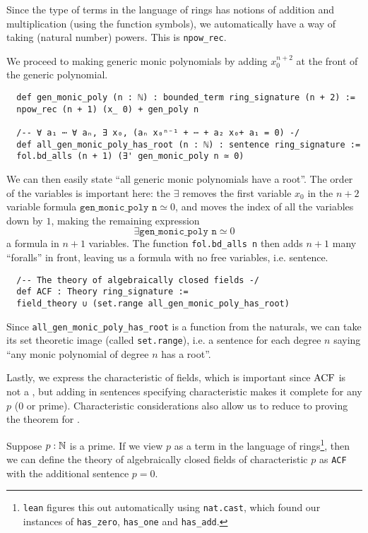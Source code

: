 \begin{dfn}
  Since the type of terms in the language of rings has notions of
  addition and multiplication (using the function symbols),
  we automatically have a way of taking (natural number) powers.
  This is \texttt{npow\_rec}.

  We proceed to making generic monic polynomials by adding
  $x_{0}^{n+2}$ at the front of the generic polynomial.

  \begin{lstlisting}
  def gen_monic_poly (n : ℕ) : bounded_term ring_signature (n + 2) :=
  npow_rec (n + 1) (x_ 0) + gen_poly n

  /-- ∀ a₁ ⋯ ∀ aₙ, ∃ x₀, (aₙ x₀ⁿ⁻¹ + ⋯ + a₂ x₀+ a₁ = 0) -/
  def all_gen_monic_poly_has_root (n : ℕ) : sentence ring_signature :=
  fol.bd_alls (n + 1) (∃' gen_monic_poly n ≃ 0) \end{lstlisting}

  We can then easily state ``all generic monic polynomials have a root''.
  The order of the variables is important here:
  the $\exists$ removes the first variable $x_{0}$ in the $n+2$ variable formula
  $\texttt{gen\_monic\_poly n} \simeq 0$, and moves the index of all the
  variables down by $1$, making the remaining expression
  \[\exists \texttt{gen\_monic\_poly n} \simeq 0\] a formula in $n+1$ variables.
  The function \texttt{fol.bd\_alls n} then adds $n+1$ many ``foralls''
  in front, leaving us a formula with no free variables, i.e. sentence.

  \begin{lstlisting}
  /-- The theory of algebraically closed fields -/
  def ACF : Theory ring_signature :=
  field_theory ∪ (set.range all_gen_monic_poly_has_root)\end{lstlisting}

  Since \texttt{all\_gen\_monic\_poly\_has\_root} is a function from the naturals,
  we can take its set theoretic image (called \texttt{set.range}),
  i.e. a sentence for each degree $n$ saying
  ``any monic polynomial of degree $n$ has a root''.

  Lastly, we express the characteristic of fields,
  which is important since $\operatorname{ACF}$ is not a ,
  but adding in sentences specifying characteristic makes it complete for any $p$ ($0$ or prime).
  Characteristic considerations also allow us to reduce to proving the theorem for
  .

  Suppose $p : \mathbb{N}$ is a prime.
  If we view $p$ as a term in the language of rings\footnote{
    \texttt{lean} figures this out automatically using \texttt{nat.cast},
    which found our instances of \texttt{has\_zero}, \texttt{has\_one}
    and \texttt{has\_add}.
  },
  then we can define the theory of algebraically closed fields of characteristic $p$
  as \texttt{ACF} with the additional sentence $p = 0$.


\end{dfn}
